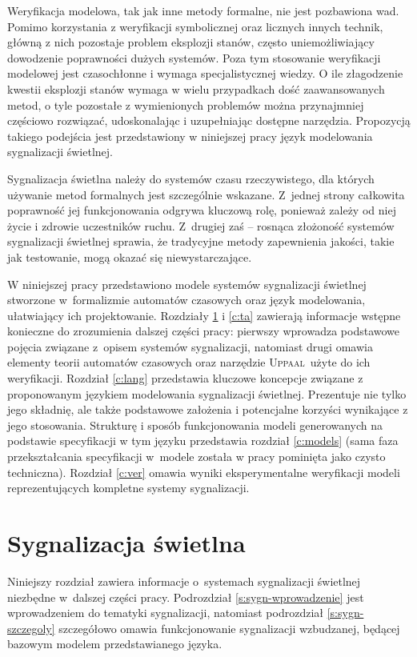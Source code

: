 \documentclass{pracamgr}
\newcommand{\upp}{\textsc{Uppaal}}
\theoremstyle{plain}
\begin{document}
Weryfikacja modelowa, tak jak inne metody formalne, nie jest
pozbawiona wad. Pomimo korzystania z weryfikacji symbolicznej oraz
licznych innych technik, główną z nich pozostaje problem eksplozji
stanów, często uniemożliwiający dowodzenie poprawności dużych
systemów. Poza tym stosowanie weryfikacji modelowej jest czasochłonne
i wymaga specjalistycznej wiedzy. O ile złagodzenie kwestii eksplozji
stanów wymaga w wielu przypadkach dość zaawansowanych metod, o tyle
pozostałe z wymienionych problemów można przynajmniej częściowo
rozwiązać, udoskonalając i uzupełniając dostępne narzędzia. Propozycją
takiego podejścia jest przedstawiony w niniejszej pracy język modelowania
sygnalizacji świetlnej.

Sygnalizacja świetlna należy do systemów czasu rzeczywistego, dla
których używanie metod formalnych jest szczególnie wskazane. Z~jednej
strony całkowita poprawność jej funkcjonowania odgrywa kluczową rolę,
ponieważ zależy od niej życie i zdrowie uczestników ruchu. Z~drugiej
zaś -- rosnąca złożoność systemów sygnalizacji świetlnej sprawia, że
tradycyjne metody zapewnienia jakości, takie jak testowanie, mogą
okazać się niewystarczające.

W niniejszej pracy przedstawiono modele systemów sygnalizacji
świetlnej stworzone w~formalizmie automatów czasowych oraz język
modelowania, ułatwiający ich projektowanie.  Rozdziały \ref{c:signals}
i \ref{c:ta} zawierają informacje wstępne konieczne do zrozumienia
dalszej części pracy: pierwszy wprowadza podstawowe pojęcia związane
z~opisem systemów sygnalizacji, natomiast drugi omawia elementy teorii
automatów czasowych oraz narzędzie \upp\ użyte do ich weryfikacji.
Rozdział \ref{c:lang} przedstawia kluczowe koncepcje związane z
proponowanym językiem modelowania sygnalizacji świetlnej. Prezentuje
nie tylko jego składnię, ale także podstawowe założenia i potencjalne
korzyści wynikające z jego stosowania. Strukturę i sposób
funkcjonowania modeli generowanych na podstawie specyfikacji w tym
języku przedstawia rozdział \ref{c:models} (sama faza przekształcania
specyfikacji w~modele została w pracy pominięta jako czysto
techniczna). Rozdział \ref{c:ver} omawia wyniki eksperymentalne
weryfikacji modeli reprezentujących kompletne systemy sygnalizacji.

\chapter{Sygnalizacja świetlna}
\label{c:signals}

Niniejszy rozdział zawiera informacje o~systemach sygnalizacji
świetlnej niezbędne w~dalszej części pracy. Podrozdział
\ref{s:sygn-wprowadzenie} jest wprowadzeniem do tematyki sygnalizacji,
natomiast podrozdział \ref{s:sygn-szczegoly} szczegółowo omawia
funkcjonowanie sygnalizacji wzbudzanej, będącej bazowym modelem
przedstawianego języka.
\end{document}
